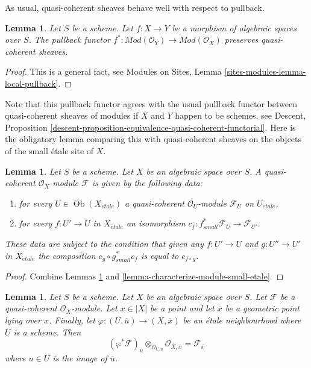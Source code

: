 \documentclass{stacks-project}
\theoremstyle{plain}
\newtheorem{lemma}[subsection]{Lemma}
\theoremstyle{definition}
\theoremstyle{remark}
\numberwithin{equation}{subsection}
\def\Ob{\mathop{\mathrm{Ob}}\nolimits}
\def\etale{{\acute{e}tale}}
\begin{document}
\medskip\noindent
As usual, quasi-coherent sheaves behave well with respect to pullback.

\begin{lemma}
\label{lemma-pullback-quasi-coherent}
Let $S$ be a scheme.
Let $f : X \to Y$ be a morphism of algebraic spaces over $S$.
The pullback functor
$f^* : \textit{Mod}(\mathcal{O}_Y) \to \textit{Mod}(\mathcal{O}_X)$
preserves quasi-coherent sheaves.
\end{lemma}

\begin{proof}
This is a general fact, see
Modules on Sites, Lemma \ref{sites-modules-lemma-local-pullback}.
\end{proof}

\noindent
Note that this pullback functor agrees with the usual pullback functor
between quasi-coherent sheaves of modules if $X$ and $Y$ happen to be
schemes, see
Descent, Proposition
\ref{descent-proposition-equivalence-quasi-coherent-functorial}.
Here is the obligatory lemma comparing this with quasi-coherent sheaves
on the objects of the small \'etale site of $X$.

\begin{lemma}
\label{lemma-characterize-quasi-coherent-small-etale}
Let $S$ be a scheme. Let $X$ be an algebraic space over $S$.
A quasi-coherent $\mathcal{O}_X$-module $\mathcal{F}$
is given by the following data:
\begin{enumerate}
\item for every $U \in \Ob(X_\etale)$ a quasi-coherent
$\mathcal{O}_U$-module $\mathcal{F}_U$ on $U_\etale$,
\item for every $f : U' \to U$ in $X_\etale$ an isomorphism
$c_f : f_{small}^*\mathcal{F}_U \to \mathcal{F}_{U'}$.
\end{enumerate}
These data are subject to the condition that given any $f : U' \to U$
and $g : U'' \to U'$ in $X_\etale$ the composition
$c_g \circ g_{small}^*c_f$ is equal to $c_{f \circ g}$.
\end{lemma}

\begin{proof}
Combine Lemmas \ref{lemma-pullback-quasi-coherent} and
\ref{lemma-characterize-module-small-etale}.
\end{proof}

\begin{lemma}
\label{lemma-stalk-quasi-coherent}
Let $S$ be a scheme.
Let $X$ be an algebraic space over $S$.
Let $\mathcal{F}$ be a quasi-coherent $\mathcal{O}_X$-module.
Let $x \in |X|$ be a point and let $\overline{x}$ be a geometric
point lying over $x$. Finally, let
$\varphi : (U, \overline{u}) \to (X, \overline{x})$
be an \'etale neighbourhood where $U$ is a scheme.
Then
$$
(\varphi^*\mathcal{F})_u \otimes_{\mathcal{O}_{U, u}}
\mathcal{O}_{X, \overline{x}} =
\mathcal{F}_{\overline{x}}
$$
where $u \in U$ is the image of $\overline{u}$.
\end{lemma}
\end{document}
